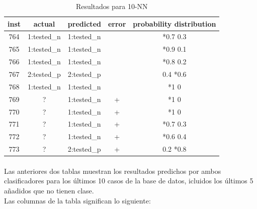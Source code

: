 \documentclass[es]{ifirak}
\begin{document}
\begin{table}[htbp]
	\centering
	\begin{tabular}{|c|c|l|c|c|}
		inst &   actual    & predicted   & error & probability  distribution \\ \hline
		764  & 1:tested\_n & 1:tested\_n &       &       *0.7  \hspace{0.4cm}   0.3        \\
		765  & 1:tested\_n & 1:tested\_n &       &        *0.9   \hspace{0.4cm} 0.1        \\
		766  & 1:tested\_n & 1:tested\_n &       &       *0.8   \hspace{0.4cm}   0.2       \\
		767  & 2:tested\_p & 2:tested\_p &       &        0.4   \hspace{0.4cm} *0.6        \\
		768  & 1:tested\_n & 1:tested\_n &       &        *1    \hspace{0.4cm}   0         \\
		769  &      ?      & 1:tested\_n &   +   &         *1   \hspace{0.4cm}   0         \\
		770  &      ?      & 1:tested\_n &   +   &        *1    \hspace{0.4cm}    0        \\
		771  &      ?      & 1:tested\_n &   +   &        *0.7  \hspace{0.4cm}  0.3        \\
		772  &      ?      & 1:tested\_n &   +   &        *0.6  \hspace{0.4cm}  0.4        \\
		773  &      ?      & 2:tested\_p &   +   &        0.2  \hspace{0.4cm}*0.8
	\end{tabular}
	\caption{Resultados para 10-NN }\label{table}
\end{table}

\paragraph{}
Las anteriores dos tablas muestran los resultados predichos por ambos clasificadores para los últimos 10 casos de la base de datos, icluidos los últimos 5 añadidos que no tienen clase.\\

Las columnas de la tabla significan lo siguiente:
\end{document}
